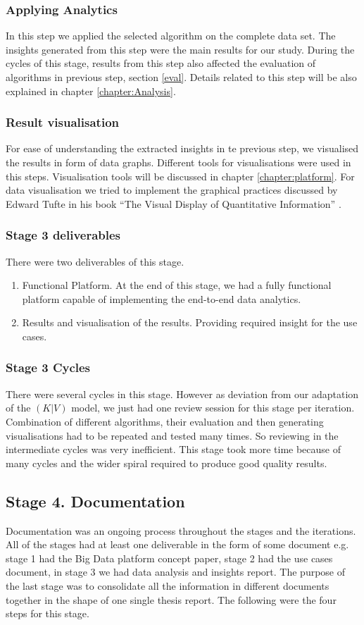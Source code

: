 \subsubsection{Applying Analytics}
In this step we applied the selected algorithm on the complete data set. The insights generated from this step were the main results for our study. During the cycles of this stage, results from this step also affected the evaluation of algorithms in previous step, section \ref{eval}. Details related to this step will be also explained in chapter \ref{chapter:Analysis}.    
\subsubsection{Result visualisation}
For ease of understanding the extracted insights in te previous step, we visualised the results in form of data graphs. Different tools for visualisations were used in this steps. Visualisation tools will be discussed in chapter \ref{chapter:platform}. For data visualisation we tried to implement the graphical practices discussed by Edward Tufte in his book ``The Visual Display of Quantitative Information'' \cite{tufte1983visual}.
\subsubsection{Stage 3 deliverables}
There were two deliverables of this stage.
\begin{enumerate}
\item Functional Platform. At the end of this stage, we had a fully functional platform capable of implementing the end-to-end data analytics.
\item Results and visualisation of the results. Providing required insight for the use cases. 
\end{enumerate}
\subsubsection{Stage 3 Cycles}
There were several cycles in this stage. However as deviation from our adaptation of the \((K|V)\) model, we just had one review session for this stage per iteration. Combination of different algorithms, their evaluation and then generating visualisations had to be repeated and tested many times. So reviewing in the intermediate cycles was very inefficient. This stage took more time because of many cycles and the wider spiral required to produce good quality results.
\subsection{Stage 4. Documentation}
Documentation was an ongoing process throughout the stages and the iterations. All of the stages had at least one deliverable in the form of some document e.g. stage 1 had the Big Data platform concept paper, stage 2 had the use cases document, in stage 3 we had data analysis and insights report. The purpose of the last stage was to consolidate all the information in different documents together in the shape of one single thesis report. The following were the four steps for this stage. 
